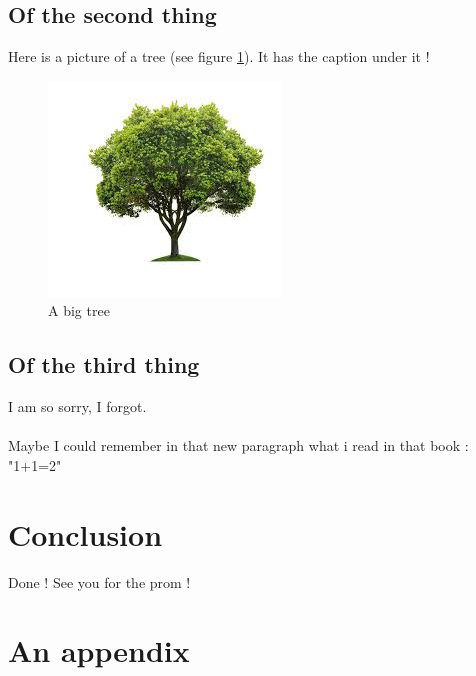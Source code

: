 \documentclass{cranfieldChart}
\begin{document}
\subsection{Of the second thing}
Here is a picture of a tree (see figure \ref{tree}). It has the caption under it !
\begin{figure}[!h]
	\centering

	\includegraphics{ressources/tree.jpg}
	\caption{A big tree}
	\label{tree}
\end{figure}
\subsection{Of the third thing}
I am so sorry, I forgot.
\paragraph{}
Maybe I could remember in that new paragraph what i read in that book : "1+1=2" \cite{ref0}

\newpage
\section{Conclusion}
Done ! See you for the prom !

\newpage

\printbibliography

\newpage

\appendix
\section{An appendix}
\end{document}
